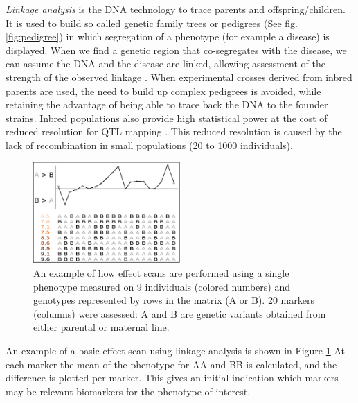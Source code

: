 \emph{Linkage analysis} is the DNA technology to trace parents and offspring/children. It is used to build so called genetic 
family trees or pedigrees (See fig. \ref{fig:pedigree}) in which segregation of a phenotype (for example a disease) is 
displayed. When we find a genetic region that co-segregates with the disease, we can assume the DNA and the disease are 
linked, allowing assessment of the strength of the observed linkage \cite{Rosyara:2009}. When experimental crosses derived 
from inbred parents are used, the need to build up complex pedigrees is avoided, while retaining the advantage of being able 
to trace back the DNA to the founder strains. Inbred populations also provide high statistical power at the cost of reduced 
resolution for QTL mapping \cite{Jansen:2001a}. This reduced resolution is caused by the lack of recombination in small 
populations (20 to 1000 individuals). 

\begin{figure}
  \centering
  \includegraphics[width=0.5\textwidth]{eps/image_1_1}
  \caption[Effect scan across the genome.]
    {An example of how effect scans are performed using a single phenotype measured on 9 individuals (colored numbers)
    and genotypes represented by rows in the matrix (A or B). 20 markers (columns) were assessed: A and B are genetic 
    variants obtained from either parental or maternal line. }
    \label{fig:effectscan}
\end{figure}

An example of a basic effect scan using linkage analysis is shown in Figure \ref{fig:effectscan} At each marker the mean of 
the phenotype for AA and BB is calculated, and the difference is plotted per marker. This gives an initial indication which 
markers may be relevant biomarkers for the phenotype of interest.

